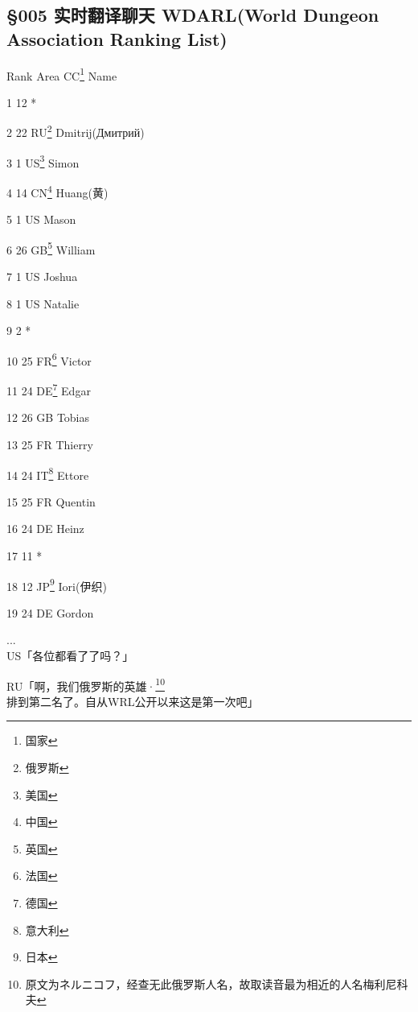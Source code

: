 \subsection{§005 实时翻译聊天 WDARL(World Dungeon Association Ranking List)}

Rank	Area	CC\footnote{国家}	Name

1		12		*

2		22		RU\footnote{俄罗斯}	Dmitrij(Дмитрий)

3		1		US\footnote{美国}	Simon

4		14		CN\footnote{中国}	Huang(黄)

5		1		US		Mason

6		26		GB\footnote{英国}	William

7		1		US		Joshua

8		1		US		Natalie

9		2		*

10		25		FR\footnote{法国}	Victor

11		24		DE\footnote{德国}	Edgar

12		26		GB		Tobias

13		25		FR		Thierry

14		24		IT\footnote{意大利}	Ettore

15		25		FR		Quentin

16		24		DE		Heinz

17		11		*

18		12		JP\footnote{日本}	Iori(伊织)

19		24		DE		Gordon

...\\

US「各位都看了了吗？」

RU「啊，我们俄罗斯的英雄·\footnote{原文为ネルニコフ，经查无此俄罗斯人名，故取读音最为相近的人名梅利尼科夫}排到第二名了。自从WRL公开以来这是第一次吧」

